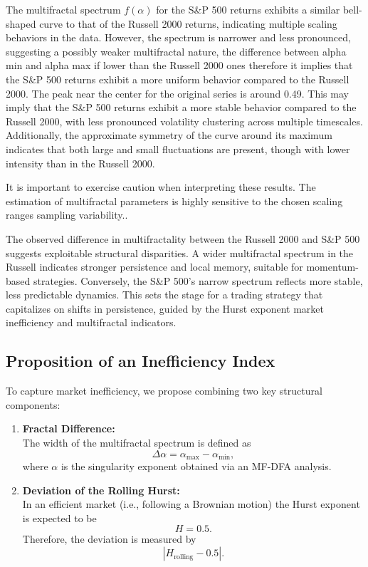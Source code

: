 \documentclass[11pt]{extarticle}
\begin{document}
\FloatBarrier

The multifractal spectrum $f(\alpha)$ for the S\&P 500 returns exhibits a similar bell-shaped curve to that of the Russell
2000 returns, indicating multiple scaling behaviors in the data. However, the spectrum is narrower and less pronounced,
suggesting a possibly weaker multifractal nature, the difference between alpha min and alpha max if lower than the Russell 2000 ones
therefore it implies that the S\&P 500 returns exhibit a more uniform behavior compared to the Russell 2000.
The peak near the center for the original series is around 0.49. This may imply that the S\&P 500 returns exhibit a more stable
behavior compared to the Russell 2000, with less pronounced volatility clustering across multiple timescales.
Additionally, the approximate symmetry of the curve around its maximum indicates that both large and small fluctuations
are present, though with lower intensity than in the Russell 2000.

It is important to exercise caution when interpreting these results. The estimation of multifractal parameters is highly
sensitive to the chosen scaling ranges sampling variability..


The observed difference in multifractality between the Russell 2000 and S\&P 500 suggests exploitable structural
disparities. A wider multifractal spectrum in the Russell indicates stronger persistence and local memory,
suitable for momentum-based strategies. Conversely, the S\&P 500's narrow spectrum reflects more stable, less predictable
dynamics. This sets the stage for a trading strategy that capitalizes on shifts in persistence, guided by the Hurst
exponent market inefficiency and multifractal indicators.

\subsection{Proposition of an Inefficiency Index}

To capture market inefficiency, we propose combining two key structural components:

\begin{enumerate}
    \item \textbf{Fractal Difference:}\\[1ex]
    The width of the multifractal spectrum is defined as
    \begin{equation}
    \Delta \alpha = \alpha_{\text{max}} - \alpha_{\text{min}},
    \end{equation}
    where $\alpha$ is the singularity exponent obtained via an MF-DFA analysis.

    \item \textbf{Deviation of the Rolling Hurst:}\\[1ex]
    In an efficient market (i.e., following a Brownian motion) the Hurst exponent is expected to be
    \begin{equation}
    H = 0.5.
    \end{equation}
    Therefore, the deviation is measured by
    \begin{equation}
    \left|H_{\text{rolling}} - 0.5\right|.
    \end{equation}
\end{enumerate}
\end{document}
